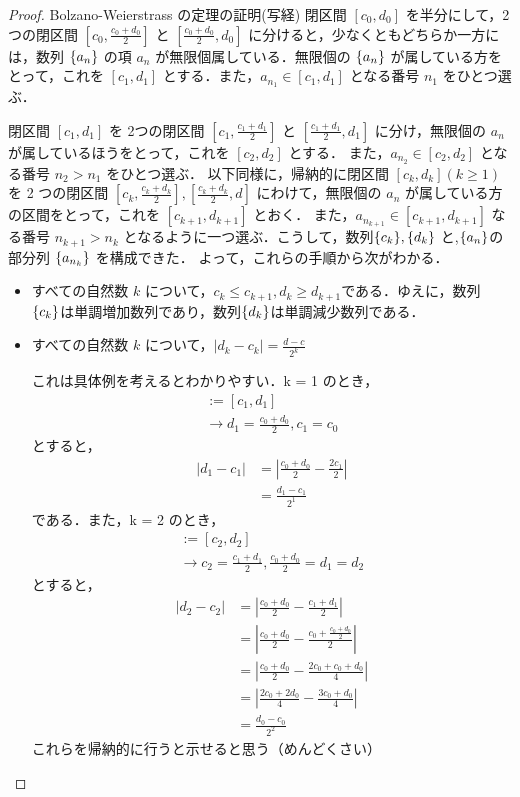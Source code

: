 \documentclass[a4paper]{ltjsarticle}
\begin{document}
   \begin{proof}{Bolzano-Weierstrass の定理の証明(写経)}{}
    閉区間 $[c_0, d_0]$ を半分にして，2つの閉区間 $[c_0, \frac{c_0 + d_0}{2}]$ と $[\frac{c_0 + d_0}{2}, d_0]$ に分けると，少なくともどちらか一方には，数列 $\{a_n\}$ の項 $a_n$ が無限個属している．無限個の $\{a_n\}$ が属している方をとって，これを $[c_1, d_1]$ とする．また，$a_{n_1} \in [c_1, d_1]$ となる番号 $n_1$ をひとつ選ぶ．

    閉区間 $[c_1, d_1]$ を 2つの閉区間 $[c_1, \frac{c_1 + d_1}{2}]$ と $[\frac{c_1 + d_1}{2}, d_1]$ に分け，無限個の $a_n$ が属しているほうをとって，これを $[c_2, d_2]$ とする．
    また，$a_{n_2} \in [c_2, d_2]$ となる番号 $n_2 > n_1$ をひとつ選ぶ．
    以下同様に，帰納的に閉区間 $[c_k, d_k] (k \geq 1)$ を 2 つの閉区間 $[c_k, \frac{c_k + d_k}{2}], [\frac{c_k + d_k}{2}, d]$ にわけて，無限個の $a_n$ が属している方の区間をとって，これを $[c_{k + 1}, d_{k + 1}]$ とおく．
    また，$a_{n_{k + 1}} \in [c_{k+1}, d_{k+1}]$ なる番号 $n_{k+1} > n_k$ となるように一つ選ぶ．こうして，数列$\{c_k\}, \{d_k\}$ と,$ \{a_n\}$の部分列 $\{a_{n_k}\}$ を構成できた．
    よって，これらの手順から次がわかる．
    \begin{itemize}
      \item すべての自然数 $k$ について，$c_k \leq c_{k+1}, d_{k} \geq d_{k+1}$である．ゆえに，数列 $\{c_k\}$は単調増加数列であり，数列$\{d_k\}$は単調減少数列である．
      \item すべての自然数 $k$ について，$|d_k - c_k| = \frac{d-c}{2^k}$

      これは具体例を考えるとわかりやすい．k = 1 のとき，
      \begin{align}
        [c_0, \frac{c_0 + d_0}{2}]:= [c_1, d_1] \\
        \longrightarrow d_1 = \frac{c_0 + d_0}{2}, c_1 = c_0
      \end{align}
      とすると，
      \begin{align}
        |d_1 - c_1| &= |\frac{c_0 + d_0}{2} - \frac{2c_1}{2}| \\
        &= \frac{d_1 - c_1}{2^1}
      \end{align}
      である．また，k = 2 のとき，
      \begin{align}
        [\frac{c_1 + d_1}{2}, d_1]:= [c_2, d_2] \\
        \longrightarrow c_2 = \frac{c_1 + d_1}{2}, \frac{c_0 + d_0}{2} = d_1 = d_2
      \end{align}
      とすると，
      \begin{align}
        |d_2 - c_2| &= |\frac{c_0 + d_0}{2} - \frac{c_1 + d_1}{2}| \\
        &= |\frac{c_0 + d_0}{2} - \frac{c_0 + \frac{c_0 + d_0}{2}}{2}| \\
        &= |\frac{c_0 + d_0}{2} - \frac{2c_0 + c_0 + d_0}{4}| \\
        &= |\frac{2c_0 + 2d_0}{4} - \frac{3c_0 + d_0}{4}| \\
        &= \frac{d_0 - c_0}{2^2}
      \end{align}
      これらを帰納的に行うと示せると思う（めんどくさい）


\end{itemize}
\end{proof}
\end{document}
